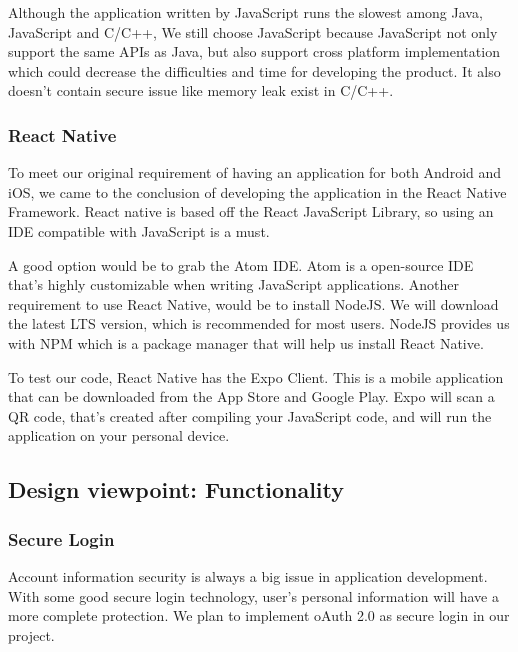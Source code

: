 \documentclass[letterpaper, 10pt,titlepage]{article}
\begin{document}
Although the application written by JavaScript runs the slowest among Java, JavaScript and C/C++, We still choose JavaScript because JavaScript not only support the same APIs as Java, but also support cross platform implementation which could decrease the difficulties and time for developing the product. It also doesn't contain secure issue like memory leak exist in C/C++.

\subsubsection{React Native}

To meet our original requirement of having an application for both Android and iOS, we came to the conclusion of developing the application in the React Native Framework. React native is based off the React JavaScript Library, so using an IDE compatible with JavaScript is a must. 

A good option would be to grab the Atom IDE. Atom is a open-source IDE that's highly customizable when writing JavaScript applications. Another requirement to use React Native, would be to install NodeJS. We will download the latest LTS version, which is recommended for most users. NodeJS provides us with NPM which is a package manager that will help us install React Native. 

To test our code, React Native has the Expo Client. This is a mobile application that can be downloaded from the App Store and Google Play. Expo will scan a QR code, that's created after compiling your JavaScript code, and will run the application on your personal device. 

\subsection{Design viewpoint: Functionality}
\subsubsection{Secure Login}
Account information security is always a big issue in application development. With some good secure login technology, user’s personal information will have a more complete protection. We plan to implement oAuth 2.0 as secure login in our project. 
\end{document}
